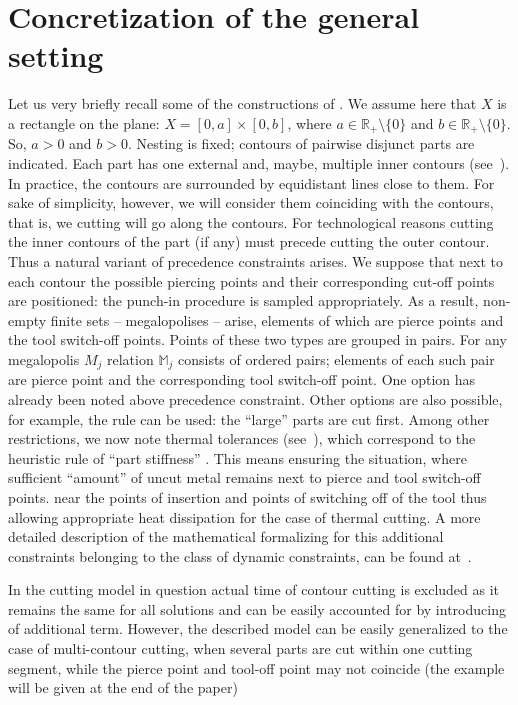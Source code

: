 \documentclass[numbers,sort&compress]{IntechOpen-Book}%
\begin{document}
\section{Concretization of the general setting}
\label{sec:3}

Let us very briefly recall some of the constructions of
\cite [$\S$ 3.3]{4}.
We assume here that $ X $ is a rectangle on the plane:
$X = [0,a] \times [0,b]$,
where
$a \in \mathbb{R}_+ \setminus \{0\}$
and $b \in \mathbb{R}_+ \setminus \{0\}.$
So, $a > 0$ and
$b > 0$.
Nesting is fixed;
contours of pairwise disjunct parts are indicated.
Each part has one external and,
maybe,
multiple inner contours
(see~\cite[\S~3.2]{4}).
In practice,
the contours are surrounded by equidistant lines close to them.
For sake of simplicity,
however,
we will consider them coinciding with the contours,
that is, we cutting will go along the contours.
For technological reasons
cutting the inner contours of the part
(if any)
must precede cutting the outer contour.
Thus a natural variant of precedence constraints arises.
We suppose
that next to each contour the possible
piercing points and their corresponding cut-off points
are positioned:
the punch-in procedure is sampled appropriately.
As a result, non-empty finite sets
-- megalopolises --
arise,
elements of which are pierce points
and the tool switch-off points.
Points of these two types are grouped in pairs.
For any megalopolis
$M_j$
relation
$\mathbb{M}_j$
consists of ordered pairs;
elements of each such pair are
pierce point
and the corresponding tool switch-off point.
One option has already been noted above
precedence constraint.
Other options are also possible,
for example,
the rule can be used:
the ``large'' parts are cut first.
Among other restrictions, we now note
thermal tolerances
(see~\cite{18}),
which correspond to the heuristic rule of ``part stiffness''
\cite{4}.
This means ensuring the situation,
where
sufficient ``amount''
of uncut metal
remains next to pierce and tool switch-off points.
near the points of insertion and points of switching off of the tool
thus allowing appropriate
heat dissipation
for the case of thermal cutting.
A more detailed description of the mathematical
formalizing
for this additional
constraints
belonging to the class of dynamic constraints,
can be found at~\cite{18}.

In the cutting model in question
actual time of contour cutting
is excluded
as it remains the same for all solutions
and can be easily accounted for by introducing of
additional term.
However,
the described model can be easily generalized to
the case of  multi-contour cutting,
when
several parts are cut within one cutting segment,
while the pierce point
and tool-off point
may not coincide
(the example will be given at the end
of the paper)
\end{document}
